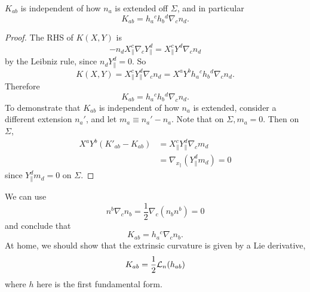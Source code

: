 \begin{lem}
    $K_{ab}$ is independent of how $n_a$ is extended off $\Sigma$, and in particular
    \begin{equation}
        K_{ab}=h_a{}^c h_b{}^d \nabla_c n_d.
    \end{equation}
\end{lem}
\begin{proof}
    The RHS of $K(X,Y)$ is
    \begin{equation}
        -n_d X_\parallel^c \nabla_c Y^d_{\parallel} = X_\parallel^c Y^d \nabla_c n_d
    \end{equation}
    by the Leibniz rule, since $n_d Y^d_\parallel=0$. So
    \begin{equation}
        K(X,Y)=X_\parallel^c Y^d_\parallel \nabla_c n_d = X^a Y^b h_a{}^c h_b{}^d \nabla_c n_d.
    \end{equation}
    Therefore
    \begin{equation}
        K_{ab}=h_a{}^c h_b{}^d \nabla_c n_d.
    \end{equation}
    To demonstrate that $K_{ab}$ is independent of how $n_a$ is extended, consider a different extension $n_a'$, and let $m_a \equiv n_a'-n_a$. Note that on $\Sigma, m_a=0$. Then on $\Sigma$,
    \begin{align*}
        X^a Y^b(K'_{ab}-K_{ab}) &= X_\parallel^c Y^d_\parallel \nabla_c m_d\\
        &= \nabla_{x_\parallel}(Y_\parallel^d m_d)=0
    \end{align*}
    since $Y_\parallel^d m_d =0$ on $\Sigma$.
\end{proof}

We can use
\begin{equation}
    n^b \nabla_c n_b = \frac{1}{2} \nabla_c(n_b n^b)=0
\end{equation}
and conclude that
\begin{equation}
    K_{ab}=h_a{}^c \nabla_c n_b.
\end{equation}
At home, we should show that the extrinsic curvature is given by a Lie derivative,
\begin{equation}
    K_{ab}=\frac{1}{2} \mathcal L_n (h_{ab})
\end{equation}
where $h$ here is the first fundamental form.